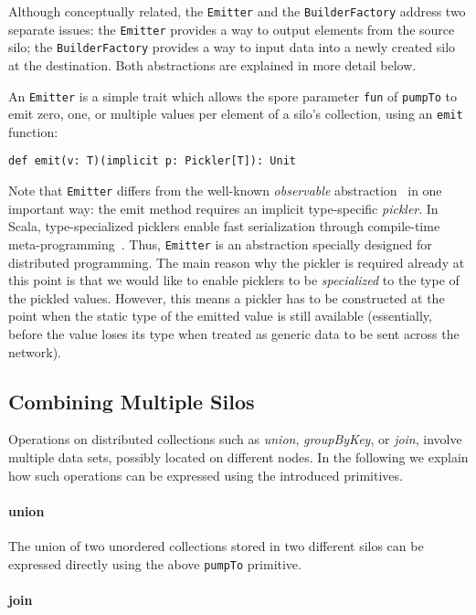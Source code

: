 \documentclass{easychair}
\begin{document}
Although conceptually related, the \verb|Emitter| and the \verb|BuilderFactory| address two
separate issues: the \verb|Emitter| provides a way to output elements from the source
silo; the \verb|BuilderFactory| provides a way to input data into a newly created
silo at the destination. Both abstractions are explained in more detail below.

An \verb|Emitter| is a simple trait which allows the spore parameter \verb|fun| of \verb|pumpTo| to
emit zero, one, or multiple values per element of a silo's collection, using an
\verb|emit| function:
\begin{verbatim}
def emit(v: T)(implicit p: Pickler[T]): Unit
\end{verbatim}
\noindent
Note that \verb|Emitter| differs from the well-known \emph{observable} abstraction~\cite{Meijer12}
in one important way: the emit method requires an implicit type-specific
\emph{pickler}. In Scala, type-specialized picklers enable fast serialization
through compile-time meta-programming~\cite{MillerHBO13}. Thus, \verb|Emitter| is an
abstraction specially designed for distributed programming. The main reason
why the pickler is required already at this point is that we would like to enable
picklers to be \emph{specialized} to the type of the pickled values. However,
this means a pickler has to be constructed at the point when the static type
of the emitted value is still available (essentially, before the
value loses its type when treated as generic data to be sent across the
network).

\subsection{Combining Multiple Silos}

Operations on distributed collections such as \emph{union}, \emph{groupByKey}, or \emph{join},
involve multiple data sets, possibly located on different nodes. In the
following we explain how such operations can be expressed using the introduced
primitives.

\paragraph{union}

The union of two unordered collections stored in two different silos can be
expressed directly using the above \verb|pumpTo| primitive.

\paragraph{join}
\end{document}
